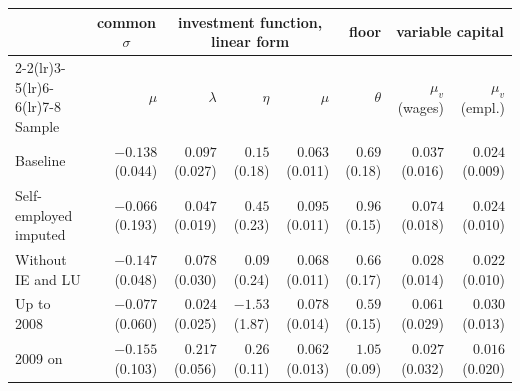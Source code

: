 \begin{tabular}{lrrrrrrr}
\toprule
 & \multicolumn{1}{c}{common \(\sigma\)} & \multicolumn{3}{c}{investment function, linear form} & floor & \multicolumn{2}{c}{variable capital} \\
\cmidrule(lr){2-2}\cmidrule(lr){3-5}\cmidrule(lr){6-6}\cmidrule(lr){7-8}
Sample & \(\mu\) & \(\lambda\) & \(\eta\) & \(\mu\) & \(\theta\) & \(\mu_v\) (wages) & \(\mu_v\) (empl.) \\
\midrule
Baseline & \(-0.138\) (0.044) & \(0.097\) (0.027) & \(0.15\) (0.18) & \(0.063\) (0.011) & \(0.69\) (0.18) & \(0.037\) (0.016) & \(0.024\) (0.009) \\
Self-employed imputed & \(-0.066\) (0.193) & \(0.047\) (0.019) & \(0.45\) (0.23) & \(0.095\) (0.011) & \(0.96\) (0.15) & \(0.074\) (0.018) & \(0.024\) (0.010) \\
Without IE and LU & \(-0.147\) (0.048) & \(0.078\) (0.030) & \(0.09\) (0.24) & \(0.068\) (0.011) & \(0.66\) (0.17) & \(0.028\) (0.014) & \(0.022\) (0.010) \\
Up to 2008 & \(-0.077\) (0.060) & \(0.024\) (0.025) & \(-1.53\) (1.87) & \(0.078\) (0.014) & \(0.59\) (0.15) & \(0.061\) (0.029) & \(0.030\) (0.013) \\
2009 on & \(-0.155\) (0.103) & \(0.217\) (0.056) & \(0.26\) (0.11) & \(0.062\) (0.013) & \(1.05\) (0.09) & \(0.027\) (0.032) & \(0.016\) (0.020) \\
\bottomrule
\end{tabular}
